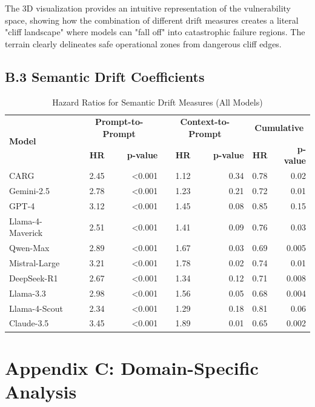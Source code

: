 \documentclass[letterpaper]{article}
\begin{document}
The 3D visualization provides an intuitive representation of the vulnerability space, showing how the combination of different drift measures creates a literal "cliff landscape" where models can "fall off" into catastrophic failure regions. The terrain clearly delineates safe operational zones from dangerous cliff edges.

\subsection*{B.3 Semantic Drift Coefficients}

\begin{table}[ht]
\centering
\caption{Hazard Ratios for Semantic Drift Measures (All Models)}
\label{tab:hazard_ratios_detailed}
\begin{tabular}{lrrrrrr}
\toprule
\multirow{2}{*}{\textbf{Model}} & \multicolumn{2}{c}{\textbf{Prompt-to-Prompt}} & \multicolumn{2}{c}{\textbf{Context-to-Prompt}} & \multicolumn{2}{c}{\textbf{Cumulative}} \\
\cmidrule(lr){2-3} \cmidrule(lr){4-5} \cmidrule(lr){6-7}
& \textbf{HR} & \textbf{p-value} & \textbf{HR} & \textbf{p-value} & \textbf{HR} & \textbf{p-value} \\
\midrule
CARG & 2.45 & <0.001 & 1.12 & 0.34 & 0.78 & 0.02 \\
Gemini-2.5 & 2.78 & <0.001 & 1.23 & 0.21 & 0.72 & 0.01 \\
GPT-4 & 3.12 & <0.001 & 1.45 & 0.08 & 0.85 & 0.15 \\
Llama-4-Maverick & 2.51 & <0.001 & 1.41 & 0.09 & 0.76 & 0.03 \\
Qwen-Max & 2.89 & <0.001 & 1.67 & 0.03 & 0.69 & 0.005 \\
Mistral-Large & 3.21 & <0.001 & 1.78 & 0.02 & 0.74 & 0.01 \\
DeepSeek-R1 & 2.67 & <0.001 & 1.34 & 0.12 & 0.71 & 0.008 \\
Llama-3.3 & 2.98 & <0.001 & 1.56 & 0.05 & 0.68 & 0.004 \\
Llama-4-Scout & 2.34 & <0.001 & 1.29 & 0.18 & 0.81 & 0.06 \\
Claude-3.5 & 3.45 & <0.001 & 1.89 & 0.01 & 0.65 & 0.002 \\
\bottomrule
\end{tabular}
\end{table}



\section*{Appendix C: Domain-Specific Analysis}
\label{app:domain_analysis}
\end{document}
